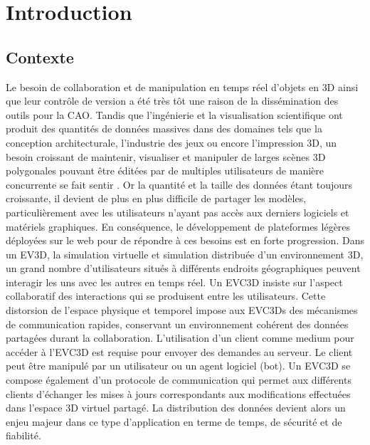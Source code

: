 \chapter{Introduction}
\chaptertable
\section{Contexte}
Le besoin de collaboration et de manipulation en temps réel d'objets en \gls{3D} 
ainsi que leur contrôle de version a été très tôt une raison de la dissémination des 
outils pour la \gls{CAO}. Tandis que l'ingénierie et la visualisation scientifique ont 
produit des quantités de données massives dans des domaines tels que la 
conception architecturale, l'industrie des jeux ou encore l'impression \gls{3D}, un 
besoin croissant de maintenir, visualiser et manipuler de larges scènes \gls{3D} 
polygonales pouvant être éditées par de multiples utilisateurs de manière 
concurrente se fait sentir \cite{Chandrasegaran2013,Wu2014}. Or la quantité et la taille des données 
étant toujours croissante, il devient de plus en plus difficile de partager les 
modèles, particulièrement avec les utilisateurs n'ayant pas accès aux derniers 
logiciels et matériels graphiques. En conséquence,
le développement de plateformes légères déployées sur le web pour de répondre à ces 
besoins est en forte progression. 
Dans un \gls{EV3D}, la simulation virtuelle et simulation distribuée d'un environnement 3D, un grand nombre d'utilisateurs situés à différents endroits géographiques peuvent 
interagir les uns avec les autres en temps réel. Un \gls{EVC3D} insiste sur l'aspect collaboratif des interactions qui se produisent entre les utilisateurs.
Cette distorsion de l'espace physique et temporel impose aux \glspl{EVC3D} des 
mécanismes de communication rapides, conservant un environnement cohérent
des données partagées durant la collaboration. 
L'utilisation d'un client comme medium pour 
accéder à l'\gls{EVC3D} est requise pour envoyer des demandes au serveur. Le 
client peut être manipulé par un utilisateur ou un agent logiciel (bot).
Un \gls{EVC3D} se compose également d'un protocole de communication qui 
permet aux différents clients d'échanger les mises à jours correspondants aux 
modifications effectuées dans l'espace 3D virtuel partagé. La distribution des 
données devient alors un enjeu majeur dans ce type d'application en terme de 
temps, de sécurité et de fiabilité. 



